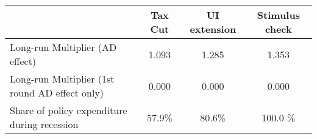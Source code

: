 \begin{tabular}{@{}lccc@{}} 
\toprule 
& Tax Cut    & UI extension    & Stimulus check    \\  \midrule 
Long-run Multiplier (AD effect) &1.093  & 1.285  & 1.353     \\ 
Long-run Multiplier (1st round AD effect only) &0.000  & 0.000  & 0.000     \\ 
Share of policy expenditure during recession &57.9\%  & 80.6\%  & 100.0 \%    \\ 
\end{tabular}  
